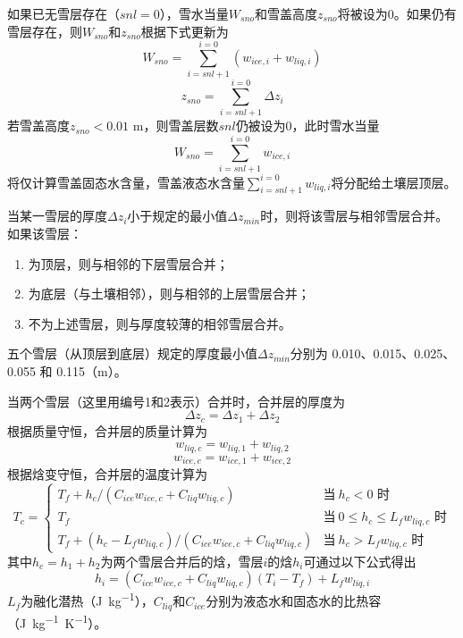 如果已无雪层存在（$snl=0$），雪水当量$W_{sno}$和雪盖高度$z_{sno}$将被设为0。如果仍有雪层存在，则$W_{sno}$和$z_{sno}$根据下式更新为
\begin{equation}
    W_{sno} = \sum_{i=snl+1}^{i=0}\left(w_{ice,i}+w_{liq,i}\right)
\end{equation}
\begin{equation}
    z_{sno} = \sum_{i=snl+1}^{i=0} \Delta z_i
\end{equation}
若雪盖高度$z_{sno} < 0.01$ \unit{m}，则雪盖层数$snl$仍被设为0，此时雪水当量
$$W_{sno}=\sum_{i=snl+1}^{i=0} w_{ice,i}$$
将仅计算雪盖固态水含量，雪盖液态水含量$\sum_{i=snl+1}^{i=0} w_{liq,i}$将分配给土壤层顶层。

当某一雪层的厚度$\Delta z_i$小于规定的最小值$\Delta z_{min}$时，则将该雪层与相邻雪层合并。如果该雪层：
\begin{enumerate}
\item 为顶层，则与相邻的下层雪层合并；
\item 为底层（与土壤相邻），则与相邻的上层雪层合并；
\item 不为上述雪层，则与厚度较薄的相邻雪层合并。
\end{enumerate}

五个雪层（从顶层到底层）规定的厚度最小值$\Delta z_{min}$分别为 0.010、0.015、0.025、0.055 和 0.115（\unit{m}）。

当两个雪层（这里用编号1和2表示）合并时，合并层的厚度为
\begin{equation}\label{eq:SnowCombThick}
\Delta {z}_c=\Delta {z}_{1}+\Delta {z}_{2}
\end{equation}
根据质量守恒，合并层的质量计算为
\begin{equation}
w_{liq,c}=w_{liq,1}+w_{liq,2}
\end{equation}
\begin{equation}
w_{ice,c}=w_{ice,1}+w_{ice,2}
\end{equation}
根据焓变守恒，合并层的温度计算为
\begin{equation}\label{eq:SnowCombTemp}
T_c=\begin{cases}
    T_f+{h_c}/\left(C_{ice}w_{ice,c}+C_{liq}w_{liq,c}\right) &\text{当}\ h_c<0 \text{ 时} \\
    T_f &\text{当}\ 0 \leqslant h_c \leqslant L_f w_{liq,c} \text{ 时}\\
    T_f+\left(h_c-L_f w_{liq,c}\right)/\left(C_{ice} w_{ice,c}+C_{liq} w_{liq,c}\right) &\text{当}\ h_c > L_f w_{liq,c} \text{ 时}
\end{cases}
\end{equation}
其中$h_c=h_1+h_2$为两个雪层合并后的焓，雪层$i$的焓$h_i$可通过以下公式得出
\begin{equation}
    h_i=\left(C_{ice}w_{ice,c}+C_{liq}w_{liq,c}\right)\left(T_i-T_f\right)+L_fw_{liq,i}
\end{equation}
$L_f$为融化潜热（\unit{J.kg^{-1}}），$C_{liq}$和$C_{ice}$分别为液态水和固态水的比热容（\unit{J.kg^{-1}.K^{-1}}）。

